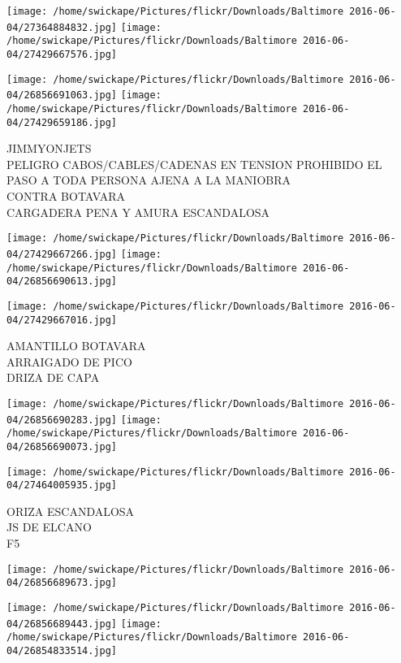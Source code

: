 \documentclass[10pt,letterpaper]{article}
\begin{document}
\texttt{[image: /home/swickape/Pictures/flickr/Downloads/Baltimore 2016-06-04/27364884832.jpg]}
\texttt{[image: /home/swickape/Pictures/flickr/Downloads/Baltimore 2016-06-04/27429667576.jpg]}

\texttt{[image: /home/swickape/Pictures/flickr/Downloads/Baltimore 2016-06-04/26856691063.jpg]}
\texttt{[image: /home/swickape/Pictures/flickr/Downloads/Baltimore 2016-06-04/27429659186.jpg]}

JIMMYONJETS\\
PELIGRO CABOS/CABLES/CADENAS EN TENSION PROHIBIDO EL PASO A TODA PERSONA AJENA A LA MANIOBRA\\
CONTRA BOTAVARA\\
CARGADERA PENA Y AMURA ESCANDALOSA\\
\pagebreak

\texttt{[image: /home/swickape/Pictures/flickr/Downloads/Baltimore 2016-06-04/27429667266.jpg]}
\texttt{[image: /home/swickape/Pictures/flickr/Downloads/Baltimore 2016-06-04/26856690613.jpg]}

\vspace{0.25in}
\texttt{[image: /home/swickape/Pictures/flickr/Downloads/Baltimore 2016-06-04/27429667016.jpg]}

AMANTILLO BOTAVARA\\
ARRAIGADO DE PICO\\
DRIZA DE CAPA\\
\pagebreak

\texttt{[image: /home/swickape/Pictures/flickr/Downloads/Baltimore 2016-06-04/26856690283.jpg]}
\texttt{[image: /home/swickape/Pictures/flickr/Downloads/Baltimore 2016-06-04/26856690073.jpg]}

\vspace{0.25in}
\texttt{[image: /home/swickape/Pictures/flickr/Downloads/Baltimore 2016-06-04/27464005935.jpg]}

ORIZA ESCANDALOSA\\
JS DE ELCANO\\
F5\\
\pagebreak

\texttt{[image: /home/swickape/Pictures/flickr/Downloads/Baltimore 2016-06-04/26856689673.jpg]}

\vspace{0.25in}
\texttt{[image: /home/swickape/Pictures/flickr/Downloads/Baltimore 2016-06-04/26856689443.jpg]}
\texttt{[image: /home/swickape/Pictures/flickr/Downloads/Baltimore 2016-06-04/26854833514.jpg]}
\end{document}
